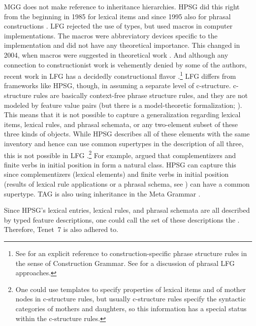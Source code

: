 \documentclass[output=paper,biblatex,babelshorthands,newtxmath,draftmode,colorlinks,citecolor=brown]{langscibook}
\begin{document}
MGG does not make reference to inheritance hierarchies. HPSG\label{cxg:page-HPSG-inheritance} did
this right from the beginning in 1985 \citep*{FPW85a} for lexical items and since 1995 also for
phrasal constructions \citep{Sag97a}. LFG rejected the use of types, but used macros in computer
implementations. The macros were abbreviatory devices specific to the implementation and did not have any theoretical importance.
This changed in 2004, when macros were suggested in theoretical work \citep*{DKK2004a}. And
although any connection to constructionist work is vehemently denied by some of the authors, recent
work in LFG has a decidedly constructional flavor \citep*{ADT2008a,AGT2014a}.\footnote{ See
   for an explicit reference to construction-specific phrase
  structure rules in the sense of Construction Grammar. See  for a
  discussion of phrasal LFG approaches.} LFG differs from frameworks like HPSG,
though, in assuming a separate level of c-structure. c-structure rules are basically context-free
phrase structure rules, and they are not modeled by feature value pairs (but there is a
model-theoretic formalization; \citealt[]{Kaplan95a}). This means that it is not possible to
capture a generalization regarding lexical items, lexical rules, and phrasal schemata, or any
two-element subset of these three kinds of objects. While HPSG describes all of these elements with
the same inventory and hence can use common supertypes in the description of all three, this is not
possible in LFG \citep[Section~23.1]{MuellerGT-Eng2}.\footnote{ One could use templates
  \citep{DKK2004a,ADT2013a} to specify properties of lexical items and of mother nodes in
  c-structure rules, but usually c-structure rules specify the syntactic categories of mothers and
  daughters, so this information has a special status within the c-structure rules.  } For example,
\citet{Hoehle97a} argued that complementizers and finite verbs in initial position in 
form a natural class. HPSG can capture this since complementizers (lexical elements) and finite
verbs in initial position (results of lexical rule applications or a phrasal schema, see ) can have a
common supertype.  TAG is also using inheritance in the Meta Grammar \citep{LK2017a}.

\largerpage
Since HPSG's lexical entries, lexical rules, and phrasal schemata are all described by typed feature
descriptions, one could call the set of these descriptions the . Therefore,
Tenet~7 is also adhered to.
\end{document}
